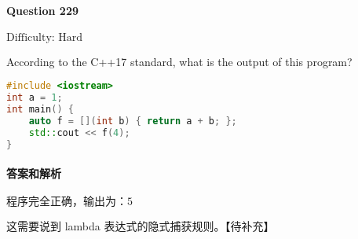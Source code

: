 \documentclass{article}
\begin{document}
	\paragraph*{Question 229}\noindent $\boxed{\text{Difficulty: Hard}} $
	
	According to the C++17 standard, what is the output of this program? 
	
	\begin{lstlisting}[language=C++]    
#include <iostream>
int a = 1;
int main() {
	auto f = [](int b) { return a + b; };
	std::cout << f(4);
}
	\end{lstlisting}
	
	\paragraph*{答案和解析} $\boxed{\text{程序完全正确，输出为：5}} $
	
	这需要说到 lambda 表达式的隐式捕获规则。【待补充】

	
	
\end{document}
